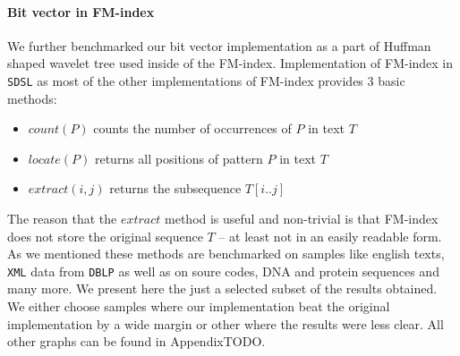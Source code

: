 \paragraph{Bit vector in FM-index}

We further benchmarked our bit vector implementation as a part of Huffman shaped wavelet tree
used inside of the FM-index. Implementation of FM-index in \texttt{SDSL} as most of the
other implementations of FM-index provides 3 basic methods:
\begin{itemize}
	\item $\mathit{count}(P)$ counts the number of occurrences of $P$ in text $T$
	\item $\mathit{locate}(P)$ returns all positions of pattern $P$ in text $T$
	\item $\mathit{extract}(i, j)$ returns the subsequence $T[i..j]$
\end{itemize}
The reason that the $\mathit{extract}$ method is useful and non-trivial is that FM-index
does not store the original sequence $T$ -- at least not in an easily readable form.
As we mentioned these methods are benchmarked on samples like english texts, \texttt{XML}
data from \texttt{DBLP} as well as on soure codes, DNA and protein sequences and many more.
We present here the just a selected subset of the results obtained. We either choose samples
where our implementation beat the original implementation by a wide margin or other where
the results were less clear. All other graphs can be found in AppendixTODO.